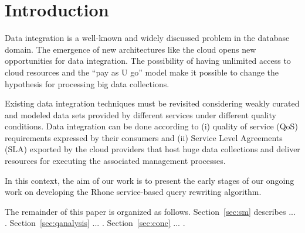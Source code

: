 \section{Introduction}
Data integration is a well-known and widely discussed problem in the database domain.
The emergence of new architectures like the cloud opens new opportunities for data integration. 
The possibility of having unlimited access to cloud resources and the ``pay as U go'' model make it possible to change the hypothesis for processing big  data collections.  

 
Existing data integration techniques must be revisited considering weakly curated and modeled data sets provided by different services under different quality conditions. Data integration can be done according to  (i) quality of service (QoS) requirements expressed by their consumers and (ii) Service Level Agreements (SLA)  exported by the cloud providers that host huge data collections and deliver resources for executing the associated management processes. 

In this context, the aim of our work is to present the early stages of our ongoing work on developing the Rhone service-based query rewriting algorithm.          

The remainder of this paper is organized as follows. Section~\ref{sec:sm}
describes ... . Section~\ref{sec:qanalysis} ... .
Section~\ref{sec:conc} ... .